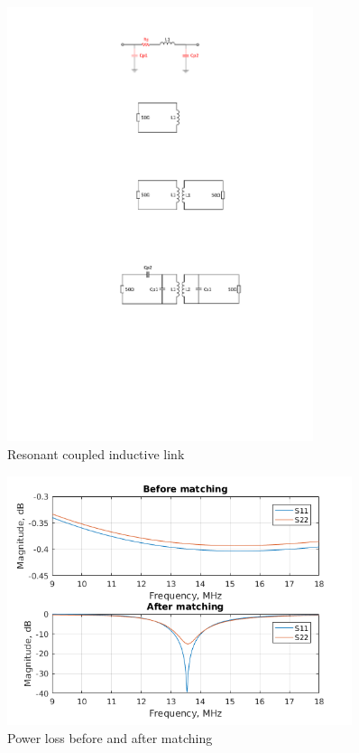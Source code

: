 \documentclass[12pt,a4paper,UKenglish]{article}
\begin{document}
\begin{figure}[!htbp] %
   \centering
   \includegraphics[width=0.8\textwidth]{img/ant_couple_resonant.pdf} 
   \caption{Resonant coupled inductive link}
   \label{fig:ant_couple_resonant}
\end{figure}

\begin{figure} [!htbp]
  \centering
  \includegraphics[width=0.9\textwidth]{img/ant_S_loss.png} 
 \caption{Power loss before and after matching} 
\label{fig:ant_S_loss} 
\end{figure}
\end{document}
